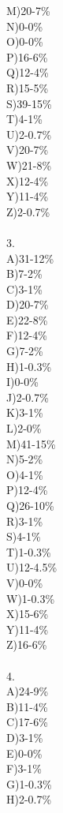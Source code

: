 \documentclass[letterpaper,10pt]{article}
\begin{document}
\begin{enumerate}
\begin{enumerate}
M)20-7\% \\
N)0-0\% \\
O)0-0\% \\
P)16-6\% \\
Q)12-4\% \\
R)15-5\% \\
S)39-15\% \\
T)4-1\% \\
U)2-0.7\% \\
V)20-7\% \\
W)21-8\% \\
X)12-4\% \\
Y)11-4\% \\
Z)2-0.7\% \\\\
3. \\
A)31-12\%\\
B)7-2\%\\
C)3-1\%\\
D)20-7\%\\
E)22-8\%\\
F)12-4\%\\
G)7-2\%\\
H)1-0.3\%\\
I)0-0\%\\
J)2-0.7\%\\
K)3-1\%\\
L)2-0\%\\
M)41-15\%\\
N)5-2\%\\
O)4-1\%\\
P)12-4\%\\
Q)26-10\%\\
R)3-1\%\\
S)4-1\%\\
T)1-0.3\%\\
U)12-4.5\%\\
V)0-0\%\\
W)1-0.3\%\\
X)15-6\%\\
Y)11-4\%\\
Z)16-6\%\\\\
4.\\
A)24-9\%\\
B)11-4\%\\
C)17-6\%\\
D)3-1\%\\
E)0-0\%\\
F)3-1\%\\
G)1-0.3\%\\
H)2-0.7\%\\

\end{enumerate}
\end{enumerate}
\end{document}
